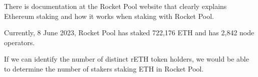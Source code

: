 \documentclass[UTF8]{article}
\begin{document}
There is documentation at the Rocket Pool website that clearly explains Ethereum staking and how it works when staking with Rocket Pool.

Currently, 8 June 2023, Rocket Pool has staked 722,176 ETH and has 2,842 node operators.

If we can identify the number of distinct rETH token holders, we would be able to determine the number of stakers staking ETH in Rocket Pool. 
%
%
%
%
%
%
\end{document}
